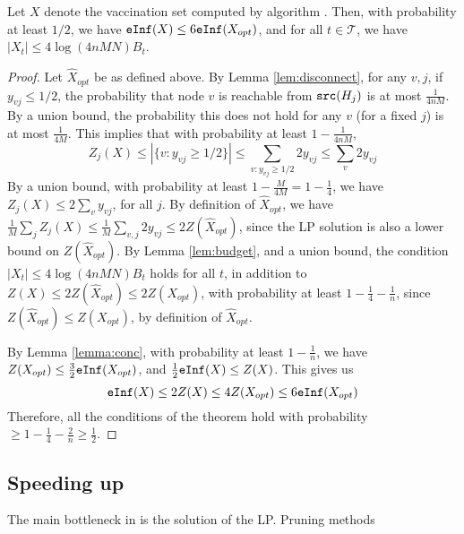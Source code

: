 \begin{theorem}
\label{theorem:algo}
Let $X$ denote the vaccination set computed by algorithm \algo{}.
Then, with probability at least $1/2$, we have
$\texttt{eInf}(X)\leq 6\texttt{eInf}(X_{opt})$, and for all $t\in\mathcal{T}$, we have
$|X_t|\leq 4\log(4nMN)B_t$.
\end{theorem}
\begin{proof}
Let $\hat{X}_{opt}$ be as defined above. 
By Lemma \ref{lem:disconnect}, for any $v, j$, if $y_{vj} \leq 1/2$, the probability that node $v$ is
reachable from $\texttt{src}(H_j)$ is at most $\frac{1}{4nM}$.
By a union bound, the probability this does not hold for any $v$ (for a fixed $j$) is at most $\frac{1}{4M}$.
This implies that with probability at least $1-\frac{1}{4nM}$, 
\[
Z_j(X)\leq |\{v: y_{vj}\geq 1/2\}|\leq \sum_{v: y_{vj}\geq 1/2} 2y_{vj} \leq \sum_v 2y_{vj}
\]
By a union bound, with probability at least $1-\frac{M}{4M}=1-\frac{1}{4}$,
we have $Z_j(X)\leq 2\sum_v y_{vj}$, for all $j$.
By definition of $\hat{X}_{opt}$, we have $\frac{1}{M}\sum_j Z_j(X)\leq \frac{1}{M}\sum_{v,j} 2y_{vj} \leq 2Z(\hat{X}_{opt})$,
since the LP solution is also a lower bound on $Z(\hat{X}_{opt})$.
By Lemma \ref{lem:budget}, and a union bound, the condition $|X_t|\leq 4\log(4nMN)B_t$ holds for all $t$,
in addition to $Z(X)\leq 2Z(\hat{X}_{opt})\leq 2Z(X_{opt})$, with probability at least $1-\frac{1}{4}-\frac{1}{n}$,
since $Z(\hat{X}_{opt})\leq Z(X_{opt})$, by definition of $\hat{X}_{opt}$.

By Lemma \ref{lemma:conc}, with probability at least $1-\frac{1}{n}$,
we have $Z(X_{opt})\leq \frac{3}{2}\texttt{eInf}(X_{opt})$, and
$\frac{1}{2}\texttt{eInf}(X)\leq Z(X)$. This gives us
\[
\texttt{eInf}(X)\leq 2Z(X)\leq 4Z(X_{opt})\leq 6\texttt{eInf}(X_{opt})
\]
Therefore, all the conditions of the theorem hold with probability $\geq 1-\frac{1}{4}-\frac{2}{n}\geq \frac{1}{2}$.
\end{proof}


\subsection{Speeding up \algo{}}

The main bottleneck in \algo{} is the solution of the LP. Pruning methods
